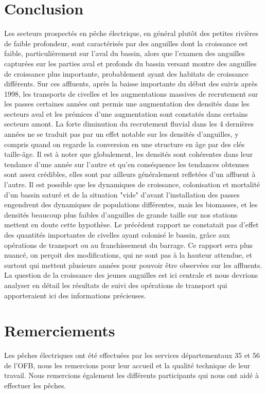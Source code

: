 \documentclass[10pt,twocolumn,titlepage,twoside]{article}\usepackage[]{graphicx}\usepackage[]{color}
\begin{document}
\section[Conclusion]{Conclusion}
Les secteurs prospectés en pêche électrique, en général plutôt des petites
rivières de faible profondeur, sont caractérisés par des anguilles dont la
croissance est faible, particulièrement sur l'aval du bassin, 
alors que l'examen des anguilles capturées sur les parties aval et profonds du bassin
versant montre des anguilles de croissance plus importante, probablement ayant
des habitats de croissance différents. Sur ces affluents, après la baisse
importante du début des suivis après 1998, les transports de civelles et les
augmentations massives de recrutement sur les passes certaines années ont permis
une augmentation des densités dans les secteurs aval et les prémices d'une
augmentation sont constatés dans certains secteurs amont. 
La forte diminution du recrutement fluvial dans les 4 dernières années ne se
traduit pas par un effet notable sur les densités d'anguilles, y compris quand
on regarde la conversion en une structure en âge par des clés taille-âge.
Il est à noter que globalement, les densités sont cohérentes dans leur tendance d'une année sur 
l'autre et qu'en conséquence les tendances
obtenues sont assez crédibles, elles sont par ailleurs généralement refletées
d'un affluent à l'autre.
Il est possible que les dynamiques de croissance, colonisation et mortalité d'un
bassin saturé et de la situation "vide" d'avant l'installation des passes
engendrent des dynamiques de populations différentes, mais les biomasses, et les
densités beaucoup plus faibles d'anguilles de grande taille sur nos stations
mettent en doute cette hypothèse.
Le précédent rapport ne constatait pas d'effet des quantités importantes de
civelles ayant colonisé le bassin, grâce aux opérations de transport ou au
franchissement du barrage. Ce rapport sera plus nuancé, on perçoit des
modifications, qui ne sont pas à la hauteur attendue, et surtout qui mettent
plusieurs années pour pouvoir être observées sur les affluents. La question de
la croissance des jeunes anguilles est ici centrale et nous devrions analyser
en détail les résultats de suivi des opérations de transport qui apporteraient
ici des informations précieuses. 

\section*{Remerciements} 
Les pêches électriques ont été effectuées par les services départementaux 35 et
56 de l'OFB, nous les remercions pour leur accueil et la qualité technique de
leur travail.
Nous remercions également les différents participants qui nous ont aidé à
effectuer les pêches.
\clearpage
\onecolumn
\printbibliography
\normalsize
\clearpage
\end{document}
